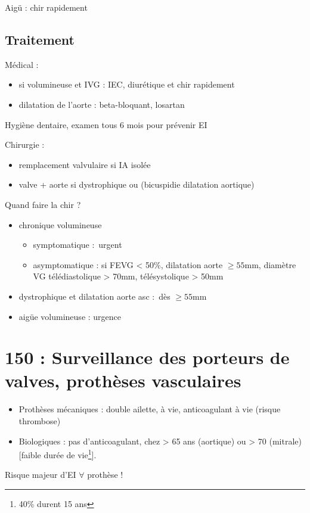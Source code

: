 \documentclass{article}
\begin{document}
Aigü : chir rapidement

\subsection{Traitement}
Médical : 
\begin{itemize}
  \item si volumineuse et IVG : IEC, diurétique et chir rapidement
  \item dilatation de l'aorte : beta-bloquant, losartan
\end{itemize}
Hygiène dentaire, examen tous 6 mois pour prévenir EI

Chirurgie : 
\begin{itemize}
  \item remplacement valvulaire si IA isolée
  \item valve + aorte si dystrophique ou (bicuspidie \land{} dilatation aortique)
\end{itemize}

Quand faire la chir ?
\begin{itemize}
  \item chronique volumineuse
    \begin{itemize}
      \item  symptomatique : urgent \danger
      \item asymptomatique : si FEVG < 50\%, dilatation aorte $\ge 55$mm, diamètre
        VG télédiastolique > 70mm, télésystolique > 50mm
    \end{itemize}
  \item dystrophique et dilatation aorte asc : dès $\ge 55$mm
  \item aigüe volumineuse : urgence
\end{itemize}

\section{150 : Surveillance des porteurs de valves, prothèses vasculaires}%
\label{sec:150_surveillance_des_porteurs_de_valves_protheses_vasculaires}

\begin{itemize}
  \item Prothèses mécaniques : double ailette, à vie, anticoagulant à vie
    (risque thrombose)
  \item Biologiques : pas d'anticoagulant, chez > 65 ans (aortique) ou > 70
    (mitrale) [faible durée de vie\footnote{40\% durent 15 ans}].
\end{itemize}
Risque majeur d'EI $\forall$ prothèse !
\end{document}
